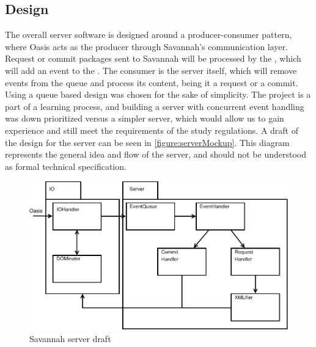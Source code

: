 \subsection{Design}
The overall server software is designed around a producer-consumer pattern, where Oasis acts as the producer through Savannah's communication layer.
Request or commit packages sent to Savannah will be processed by the , which will add an event to the . The consumer is the server itself, which will remove events from the queue and process its content, being it a request or a commit. Using a queue based design was chosen for the sake of simplicity. The project is a part of a learning process, and building a server with concurrent event handling was down prioritized versus a simpler server, which would allow us to gain experience and still meet the requirements of the study regulations.
 A draft of the design for the server can be seen in \autoref{figure:serverMockup}. This diagram represents the general idea and flow of the server, and should not be understood as formal technical specification.
\begin{figure}[H]
 \centering
  \includegraphics[width=1.00\textwidth]{images/savaIniDesign}
 \caption{Savannah server draft}
 \label{figure:serverMockup}
\end{figure}
